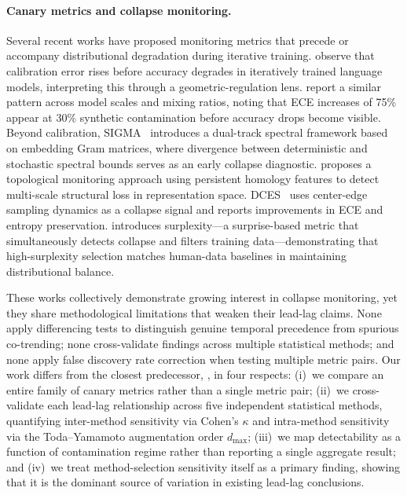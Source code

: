 \paragraph{Canary metrics and collapse monitoring.}

Several recent works have proposed monitoring metrics that precede or accompany distributional degradation during iterative training.
\citet{du2026geometric} observe that calibration error rises before accuracy degrades in iteratively trained language models, interpreting this through a geometric-regulation lens.
\citet{chen2025scales} report a similar pattern across model scales and mixing ratios, noting that ECE increases of 75\% appear at 30\% synthetic contamination before accuracy drops become visible.
Beyond calibration, SIGMA~\cite{sigma2026spectral} introduces a dual-track spectral framework based on embedding Gram matrices, where divergence between deterministic and stochastic spectral bounds serves as an early collapse diagnostic.
\citet{kalinowski2026topology} proposes a topological monitoring approach using persistent homology features to detect multi-scale structural loss in representation space.
DCES~\cite{dces2026counter} uses center-edge sampling dynamics as a collapse signal and reports improvements in ECE and entropy preservation.
\citet{gambetta2024surplexity} introduces surplexity---a surprise-based metric that simultaneously detects collapse and filters training data---demonstrating that high-surplexity selection matches human-data baselines in maintaining distributional balance.

These works collectively demonstrate growing interest in collapse monitoring, yet they share methodological limitations that weaken their lead-lag claims.
None apply differencing tests to distinguish genuine temporal precedence from spurious co-trending; none cross-validate findings across multiple statistical methods; and none apply false discovery rate correction when testing multiple metric pairs.
Our work differs from the closest predecessor, \citet{du2026geometric}, in four respects:
(i)~we compare an entire family of canary metrics rather than a single metric pair;
(ii)~we cross-validate each lead-lag relationship across five independent statistical methods, quantifying inter-method sensitivity via Cohen's $\kappa$ and intra-method sensitivity via the Toda--Yamamoto augmentation order $d_{\max}$;
(iii)~we map detectability as a function of contamination regime rather than reporting a single aggregate result; and
(iv)~we treat method-selection sensitivity itself as a primary finding, showing that it is the dominant source of variation in existing lead-lag conclusions.

